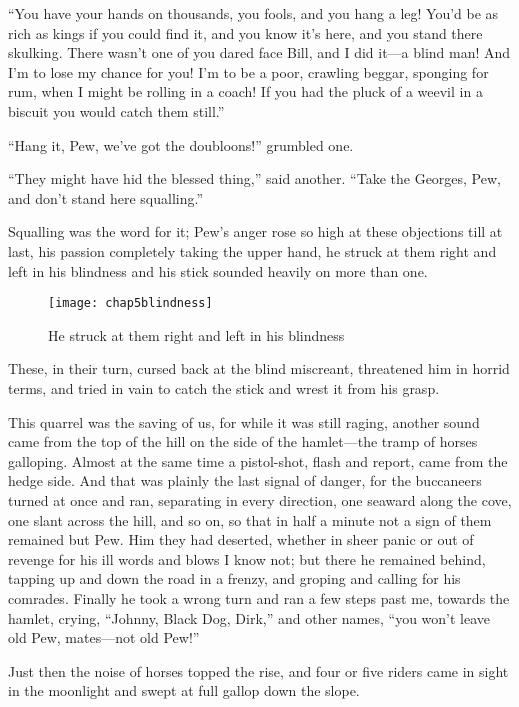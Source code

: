 \enquote{You have your hands on thousands, you fools, and you hang a leg! You’d be as rich as kings if you could find it, and you know it’s here, and you stand there skulking. There wasn’t one of you dared face Bill, and I did it---a blind man! And I’m to lose my chance for you! I’m to be a poor, crawling beggar, sponging for rum, when I might be rolling in a coach! If you had the pluck of a weevil in a biscuit you would catch them still.}

\enquote{Hang it, Pew, we’ve got the doubloons!} grumbled one.

\enquote{They might have hid the blessed thing,} said another. \enquote{Take the Georges, Pew, and don’t stand here squalling.}

Squalling was the word for it; Pew’s anger rose so high at these objections till at last, his passion completely taking the upper hand, he struck at them right and left in his blindness and his stick sounded heavily on more than one.

\begin{sidewaysfigure}
\texttt{[image: chap5blindness]}%
\caption{He struck at them right and left in his blindness}
\end{sidewaysfigure} 

These, in their turn, cursed back at the blind miscreant, threat\-ened him in horrid terms, and tried in vain to catch the stick and wrest it from his grasp.

This quarrel was the saving of us, for while it was still raging, another sound came from the top of the hill on the side of the hamlet---the tramp of horses galloping. Almost at the same time a pistol-shot, flash and report, came from the hedge side. And that was plainly the last signal of danger, for the buccaneers turned at once and ran, separating in every direction, one seaward along the cove, one slant across the hill, and so on, so that in half a minute not a sign of them remained but Pew. Him they had deserted, whether in sheer panic or out of revenge for his ill words and blows I know not; but there he remained behind, tapping up and down the road in a frenzy, and groping and calling for his comrades. Finally he took a wrong turn and ran a few steps past me, towards the hamlet, crying, \enquote{Johnny, Black Dog, Dirk,} and other names, \enquote{you won’t leave old Pew, mates---not old Pew!}

Just then the noise of horses topped the rise, and four or five riders came in sight in the moonlight and swept at full gallop down the slope.


